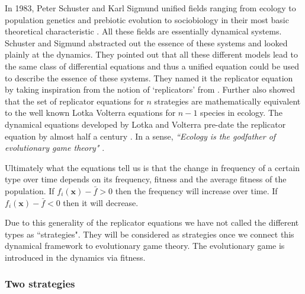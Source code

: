 \documentclass[oneside,11pt,a4paper]{book}
\begin{document}
In 1983, Peter Schuster and Karl Sigmund unified fields ranging from ecology to population genetics and prebiotic evolution to sociobiology in their most basic theoretical characteristic \citep{schuster:1983le}.
All these fields are essentially dynamical systems.
Schuster and Sigmund abstracted out the essence of these systems and looked plainly at the dynamics.
They pointed out that all these different models lead to the same class of differential equations and thus a unified equation could be used to describe the essence of these systems.
They named it the replicator equation by taking inspiration from the notion of `replicators' from \citet{dawkins:1982da}.
Further \citet{hofbauer:1998mm} also showed that the set of replicator equations for $n$ strategies are mathematically equivalent to the well known Lotka Volterra equations for $n-1$ species in ecology.
The dynamical equations developed by Lotka and Volterra pre-date the replicator equation by almost half a century \citep{lotka:1920pn,volterra:1928aa}.
In a sense, \textit{``Ecology is the godfather of evolutionary game theory"} \citep{hofbauer:1998mm}.

Ultimately what the equations tell us is that the change in frequency of a certain type over time depends on its frequency, fitness and the average fitness of the population.
If $f_i (\mathbf{x}) - \bar{f} > 0$ then the frequency will increase over time.
If $f_i (\mathbf{x}) - \bar{f} < 0$ then it will decrease.

Due to this generality of the replicator equations we have not called the different types as ``strategies".
They will be considered as strategies once we connect this dynamical framework to evolutionary game theory.
The evolutionary game is introduced in the dynamics via fitness.

\subsubsection{Two strategies}
\end{document}
